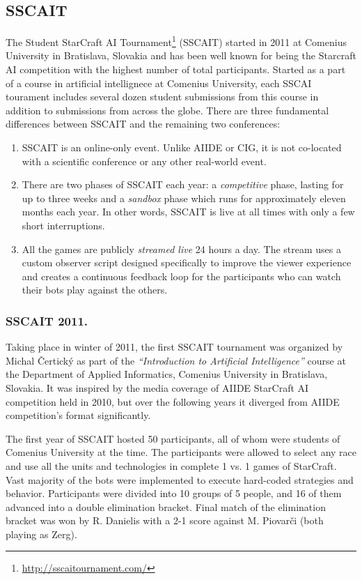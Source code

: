 \documentclass{llncs}
\begin{document}
\subsection{SSCAIT}\label{sec:SSCAIT}
The Student StarCraft AI Tournament\footnote{\url{http://sscaitournament.com/}} (SSCAIT) started in 2011 at Comenius University in Bratislava, Slovakia and has been well known for being the Starcraft AI competition with the highest number of total participants. Started as a part of a course in artificial intellignece at Comenius University, each SSCAI tourament includes several dozen student submissions from this course in addition to submissions from across the globe. 
There are three fundamental differences between SSCAIT and the remaining two conferences:
\begin{enumerate}
  \item SSCAIT is an online-only event. Unlike AIIDE or CIG, it is not co-located with a scientific conference or any other real-world event.
  \item There are two phases of SSCAIT each year: a {\em competitive} phase, lasting for up to three weeks and a {\em sandbox} phase which runs for approximately eleven months each year. In other words, SSCAIT is live at all times with only a few short interruptions.
  \item All the games are publicly {\em streamed live} 24 hours a day. The stream uses a custom observer script \cite{mattsson2015automatic} designed specifically to improve the viewer experience and creates a continuous feedback loop for the participants who can watch their bots play against the others.
\end{enumerate}

\subsubsection{SSCAIT 2011.}
Taking place in winter of 2011, the first SSCAIT tournament was organized by Michal \v{C}ertick\'{y} as part of the {\em ``Introduction to Artificial Intelligence''} course at the Department of Applied Informatics, Comenius University in Bratislava, Slovakia. It was inspired by the media coverage of AIIDE StarCraft AI competition held in 2010, but over the following years it diverged from AIIDE competition's format significantly.

The first year of SSCAIT hosted 50 participants, all of whom were students of Comenius University at the time. The participants were allowed to select any race and use all the units and technologies in complete 1 vs. 1 games of StarCraft. Vast majority of the bots were implemented to execute hard-coded strategies and behavior. Participants were divided into 10 groups of 5 people, and 16 of them advanced into a double elimination bracket. Final match of the elimination bracket was won by R. Danielis with a 2-1 score against M. Piovar\v{c}i (both playing as Zerg).
\end{document}
